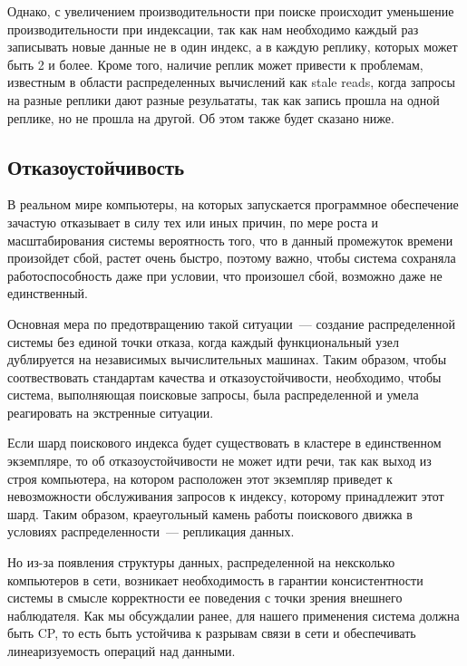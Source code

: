Однако, с увеличением производительности при поиске происходит уменьшение производительности при индексации, так как нам необходимо каждый раз записывать новые данные не в один индекс, а в каждую реплику, которых может быть 2 и более. Кроме того, наличие реплик может привести к проблемам, известным в области распределенных вычислений как stale reads, когда запросы на разные реплики дают разные резульататы, так как запись прошла на одной реплике, но не прошла на другой. Об этом также будет сказано ниже.

\subsection{Отказоустойчивость}

В реальном мире компьютеры, на которых запускается программное обеспечение зачастую отказывает в силу тех или иных причин, по мере роста и масштабирования системы вероятность того, что в данный промежуток времени произойдет сбой, растет очень быстро, поэтому важно, чтобы система сохраняла работоспособность даже при условии, что произошел сбой, возможно даже не единственный.

Основная мера по предотвращению такой ситуации~--- создание распределенной системы без единой точки отказа, когда каждый функциональный узел дублируется на независимых вычислительных машинах. Таким образом, чтобы соотвествовать стандартам качества и отказоустойчивости, необходимо, чтобы система, выполняющая поисковые запросы, была распределенной и умела реагировать на экстренные ситуации.

Если шард поискового индекса будет существовать в кластере в единственном экземпляре, то об отказоустойчивости не может идти речи, так как выход из строя компьютера, на котором расположен этот экземпляр приведет к невозможности обслуживания запросов к индексу, которому принадлежит этот шард. Таким образом, краеугольный камень работы поискового движка в условиях распределенности~--- репликация данных.

Но из-за появления структуры данных, распределенной на нексколько компьютеров в сети, возникает необходимость в гарантии консистентности системы в смысле корректности ее поведения с точки зрения внешнего наблюдателя. Как мы обсуждалии ранее, для нашего применения система должна быть CP, то есть быть устойчива к разрывам связи в сети и обеспечивать линеаризуемость операций над данными.

\clearpage
